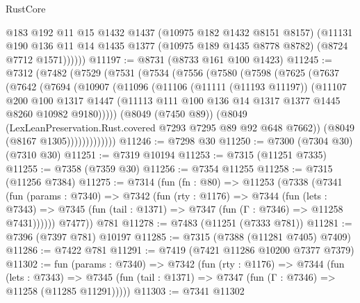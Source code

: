 \begin{lexlean}{RustCore}
\begin{coremodule}
            @183
            @192
            @11
            @15
            @1432
            @1437
            (@10975 @182 @1432 @8151 @8157)
            (@11131
              @190
              @136
              @11
              @14
              @1435
              @1377
              (@10975 @189 @1435 @8778 @8782)
              (@8724 @7712 @1571))))))
@11197 := @8731 (@8733 @161 @100 @1423)
@11245 := @7312
    (@7482
      (@7529
        (@7531
          (@7534
            (@7556
              (@7580
                (@7598
                  (@7625
                    (@7637
                      (@7642
                        (@7694
                          (@10907
                            (@11096
                              (@11106
                                (@11111 (@11193 @11197))
                                (@11107
                                  @200
                                  @100
                                  @1317
                                  @1447
                                  (@11113
                                    @111
                                    @100
                                    @136
                                    @14
                                    @1317
                                    @1377
                                    @1445
                                    @8260
                                    @10982
                                    @9180)))))
                          (@8049 (@7450 @89))
                          (@8049 (LexLeanPreservation.Rust.covered @7293 @7295 @89 @92 @648 @7662))
                          (@8049 (@8167 @1305)))))))))))))
@11246 := @7298 @30
@11250 := @7300 (@7304 @30) (@7310 @30)
@11251 := @7319 @10194
@11253 := @7315 (@11251 @7335)
@11255 := @7358 (@7359 @30)
@11256 := @7354 @11255
@11258 := @7315 (@11256 @7384)
@11275 := @7314
    (fun (fn : @80) =>
    @11253
      (@7338
        (@7341
          (fun (params : @7340) =>
          @7342
            (fun (rty : @1176) =>
            @7344
              (fun (lets : @7343) =>
              @7345 (fun (tail : @1371) => @7347 (fun (Γ : @7346) => @11258 @7431))))))
        @7477))
    @781
@11278 := @7483 (@11251 (@7333 @781))
@11281 := @7396 (@7397 @781) @10197
@11285 := @7315 (@7388 (@11281 @7405) @7409)
@11286 := @7422 @781
@11291 := @7419 (@7421 @11286 @10200 @7377 @7379)
@11302 := fun (params : @7340) =>
  @7342
    (fun (rty : @1176) =>
    @7344
      (fun (lets : @7343) =>
      @7345 (fun (tail : @1371) => @7347 (fun (Γ : @7346) => @11258 (@11285 @11291)))))
@11303 := @7341 @11302

\end{coremodule}
\end{lexlean}
